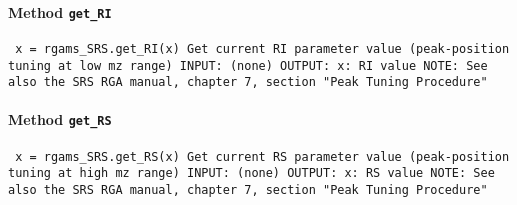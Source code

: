 \paragraph{Method \texttt{get_RI}}
\vspace{1ex}
\texttt{\newline
x = rgams_SRS.get_RI(x)\newline
\newline
Get current RI parameter value (peak-position tuning at low mz range)\newline
\newline
INPUT:\newline
(none)\newline
\newline
OUTPUT:\newline
x: RI value\newline
\newline
NOTE:\newline
See also the SRS RGA manual, chapter 7, section "Peak Tuning Procedure"\newline
\newline
}

\paragraph{Method \texttt{get_RS}}
\vspace{1ex}
\texttt{\newline
x = rgams_SRS.get_RS(x)\newline
\newline
Get current RS parameter value (peak-position tuning at high mz range)\newline
\newline
INPUT:\newline
(none)\newline
\newline
OUTPUT:\newline
x: RS value\newline
\newline
NOTE:\newline
See also the SRS RGA manual, chapter 7, section "Peak Tuning Procedure"\newline
\newline
}

